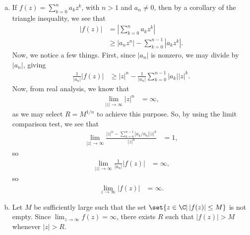 \documentclass[10pt]{mypackage}
\begin{document}
\begin{solution}\hfill
  \begin{enumerate}[(a)]
    \item If $f(z) = \sum_{k=0}^{n} a_kz^{k}$, with $n > 1$ and $a_n \neq 0$, then by a corollary of the triangle inequality, we see that
      \begin{align*}
        \left\vert f(z) \right\vert &= \left\vert \sum_{k=0}^{n}a_kz^{k} \right\vert\\
                                    &\geq \left\vert a_nz^{n} \right\vert - \sum_{k=0}^{n-1}\left\vert a_kz^{k} \right\vert.
      \end{align*}
      Now, we notice a few things. First, since $\left\vert a_n \right\vert$ is nonzero, we may divide by $\left\vert a_n \right\vert$, giving
      \begin{align*}
        \frac{1}{\left\vert a_n \right\vert} \left\vert f(z) \right\vert &\geq \left\vert z \right\vert^{n} - \frac{1}{\left\vert a_n \right\vert} \sum_{k=0}^{n-1} \left\vert a_k \right\vert \left\vert z \right\vert^{k}.
      \end{align*}
      Now, from real analysis, we know that
      \begin{align*}
        \lim_{|z|\rightarrow\infty} |z|^{n} &= \infty,
      \end{align*}
      as we may select $R = M^{1/n}$ to achieve this purpose. So, by using the limit comparison test, we see that
      \begin{align*}
        \lim_{|z|\rightarrow\infty} \frac{\left\vert z \right\vert^{n} - \sum_{k=0}^{n-1} \left\vert a_k/a_n \right\vert \left\vert z \right\vert^{k}}{\left\vert z \right\vert^{n}} &= 1,
      \end{align*}
      so
      \begin{align*}
        \lim_{\left\vert z \right\vert\rightarrow\infty} \frac{1}{\left\vert a_n \right\vert} \left\vert f(z) \right\vert &= \infty,
      \end{align*}
      so
      \begin{align*}
        \lim_{z\rightarrow\infty} \left\vert f(z) \right\vert &= \infty.
      \end{align*}
    \item Let $M$ be sufficiently large such that the set $\set{z\in \C | \left\vert f(z) \right\vert \leq M}$ is not empty. Since $\lim_{z\rightarrow\infty} f(z) = \infty$, there exists $R$ such that $\left\vert f(z) \right\vert > M$ whenever $\left\vert z \right\vert > R$.\newline


\end{enumerate}
\end{solution}
\end{document}
